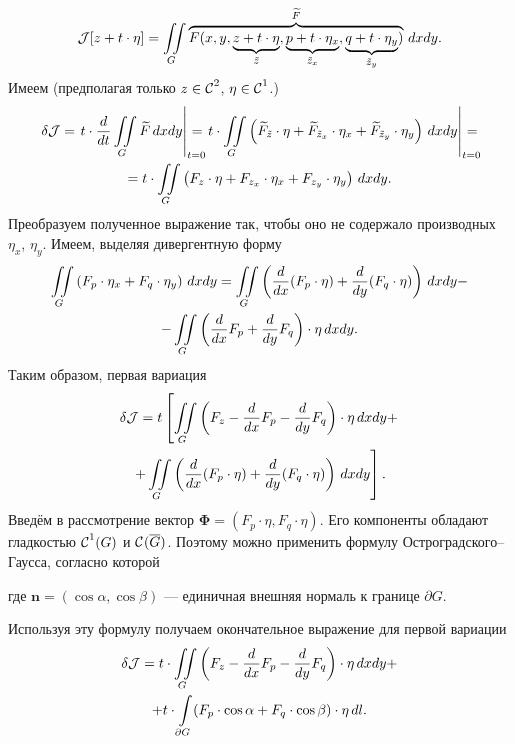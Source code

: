 \begin{equation*}
	\mathcal{J}[z+t\cdot\eta]=\iint\limits_{G}\overbrace{F(x,y,\underbrace{z+t\cdot\eta}_{\tilde{z}},\underbrace{p+t\cdot\eta_x}_{\tilde{z}_x},\underbrace{q+t\cdot\eta_y}_{\tilde{z}_y})}^{\widetilde{F}}\,dxdy.
\end{equation*}
Имеем (предполагая только $z\in\mathcal{C}{\mathstrut}^{2}_{}$, $\eta\in\mathcal{C}{\mathstrut}^{1}_{}$.)
\begin{multline*}
	\delta\J=\left.t\cdot\der{}{t}\iint\limits_{G}\widetilde{F}\,dxdy\right|_{\lefteqn{\scriptstyle t=0}}=\left.t\cdot\iint\limits_{G}\left(\widetilde{F}_{\tilde{z}}\cdot\eta+\widetilde{F}_{\tilde{z}_x}\cdot\eta_x+\widetilde{F}_{\tilde{z}_y}\cdot\eta_y\right)\,dxdy\right|_{\lefteqn{\scriptstyle t=0}}=\\=t\cdot\iint\limits_{G}\left({F}_{z}\cdot\eta+{F}_{z_x}\cdot\eta_x+{F}_{z_y}\cdot\eta_y\right)\,dxdy.
\end{multline*}
Преобразуем полученное выражение так, чтобы оно не содержало производных $\eta_x$, $\eta_y$. Имеем, выделяя дивергентную форму 
\begin{multline*}
	\iint\limits_{G}\left(F_p\cdot\eta_x+F_q\cdot\eta_y\right)\,dxdy=\iint\limits_{G}\left(\frac{d}{dx}(F_p\cdot\eta)+\frac{d}{dy}(F_q\cdot\eta)\right)\,dxdy-\\-\iint\limits_{G}\left(\frac{d}{dx}F_p+\frac{d}{dy}F_q\right)\cdot\eta\,dxdy.
\end{multline*}
Таким образом, первая вариация
\begin{multline*}
	\delta\mathcal{J}=t\left[\iint\limits_{G}\left(F_z-\frac{d}{dx}F_p-\frac{d}{dy}F_q\right)\cdot\eta\,dxdy+\right.\\\left.+\iint\limits_{G}\left(\frac{d}{dx}(F_p\cdot\eta)+\frac{d}{dy}(F_q\cdot\eta)\right)\,dxdy\right].
\end{multline*}
Введём в рассмотрение вектор $\bm{\Phi}=(F_p\cdot\eta,F_q\cdot\eta)$. Его компоненты обладают гладкостью $\mathcal{C}{\mathstrut}^{1}_{}(G)$ и $\mathcal{C}{\mathstrut}^{}_{}(\overline{G})$. Поэтому можно применить формулу Остроградского--Гаусса, согласно которой
\begin{center}
\end{center}
где $\bm{n}=(\cos\alpha,\cos\beta)$ --- единичная внешняя нормаль к границе $\partial G$.

\noindent Используя эту формулу получаем окончательное выражение для первой вариации
\begin{multline}\label{l9:eq:10}
	\delta\mathcal{J}=t\cdot\iint\limits_{G}\left(F_z-\frac{d}{dx}F_p-\frac{d}{dy}F_q\right)\cdot\eta\,dxdy+\\+t\cdot\int\limits_{\partial G}(F_p\cdot\cos\alpha+F_q\cdot\cos\beta)\cdot\eta\,dl.
\end{multline}

